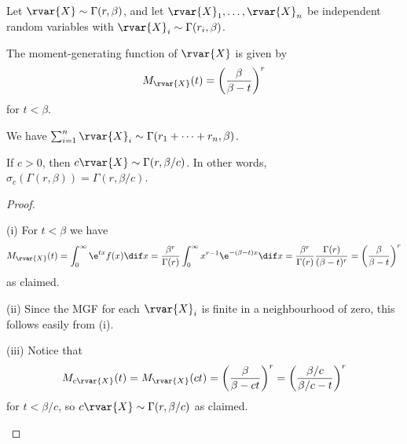 \documentclass[article, a4paper, 11pt, oneside]{memoir}
\numberwithin{equation}{chapter}
\begin{document}
\begin{proposition}
    Let $\rvar{X} \sim \Gamma(r,\beta)$, and let $\rvar{X}_1, \ldots, \rvar{X}_n$ be independent random variables with $\rvar{X}_i \sim \Gamma(r_i,\beta)$.
    \begin{enumprop}
        \item The moment-generating function of $\rvar{X}$ is given by
        \begin{equation*}
            M_{\rvar{X}}(t)
                = \biggl( \frac{\beta}{\beta - t} \biggr)^r
        \end{equation*}
        for $t < \beta$.

        \item We have $\sum_{i=1}^n \rvar{X}_i \sim \Gamma(r_1 + \cdots + r_n, \beta)$.

        \item If $c > 0$, then $c\rvar{X} \sim \Gamma(r,\beta/c)$. In other words, $\sigma_c(\Gamma(r,\beta)) = \Gamma(r,\beta/c)$.
    \end{enumprop}
\end{proposition}

\begin{proof}
\begin{proofsec}
    \item[(i)]
    For $t < \beta$ we have
    \begin{equation*}
        M_{\rvar{X}}(t)
            = \int_0^\infty \e^{tx} f(x) \dif x
            = \frac{\beta^r}{\Gamma(r)} \int_0^\infty x^{r-1} \e^{-(\beta-t)x} \dif x
            = \frac{\beta^r}{\Gamma(r)} \frac{\Gamma(r)}{(\beta-t)^r}
            = \biggl( \frac{\beta}{\beta - t} \biggr)^r
    \end{equation*}
    as claimed.

    \item[(ii)]
    Since the MGF for each $\rvar{X}_i$ is finite in a neighbourhood of zero, this follows easily from (i).

    \item[(iii)] Notice that
    \begin{equation*}
        M_{c\rvar{X}}(t)
            = M_{\rvar{X}}(ct)
            = \biggl( \frac{\beta}{\beta - ct} \biggr)^r
            = \biggl( \frac{\beta/c}{\beta/c - t} \biggr)^r
    \end{equation*}
    for $t < \beta/c$, so $c\rvar{X} \sim \Gamma(r,\beta/c)$ as claimed.
\end{proofsec}
\end{proof}
\end{document}
